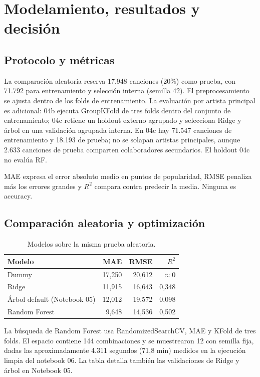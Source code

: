 \clearpage
\section{Modelamiento, resultados y decisión}

\subsection{Protocolo y métricas}

La comparación aleatoria reserva 17.948 canciones (20\%) como prueba, con 71.792 para
entrenamiento y selección interna (semilla 42). El preprocesamiento se ajusta dentro de los
folds de entrenamiento. La evaluación por artista principal es adicional: 04b ejecuta
GroupKFold de tres folds dentro del conjunto de entrenamiento; 04c retiene un holdout externo
agrupado y selecciona Ridge y árbol en una validación agrupada interna. En 04c hay 71.547
canciones de entrenamiento y 18.193 de prueba; no se solapan artistas principales, aunque
2.633 canciones de prueba comparten colaboradores secundarios. El holdout 04c no evalúa RF.

MAE expresa el error absoluto medio en puntos de popularidad, RMSE penaliza más los errores
grandes y $R^2$ compara contra predecir la media. Ninguna es accuracy.

\subsection{Comparación aleatoria y optimización}

\begin{table}[H]
\centering
\caption{Modelos sobre la misma prueba aleatoria.}
\begin{tabular}{lrrr}
\toprule
Modelo & MAE & RMSE & $R^2$ \\
\midrule
Dummy & 17,250 & 20,612 & $\approx 0$ \\
Ridge & 11,915 & 16,643 & 0,348 \\
Árbol default (Notebook 05) & 12,012 & 19,572 & 0,098 \\
Random Forest & 9,648 & 14,536 & 0,502 \\
\bottomrule
\end{tabular}
\end{table}

La búsqueda de Random Forest usa RandomizedSearchCV, MAE y KFold de tres folds. El espacio
contiene 144 combinaciones y se muestrearon 12 con semilla fija, dadas las aproximadamente 4.311
segundos (71,8 min) medidos en la ejecución limpia del notebook 06. La tabla detalla también las validaciones de Ridge y árbol
en Notebook 05.

